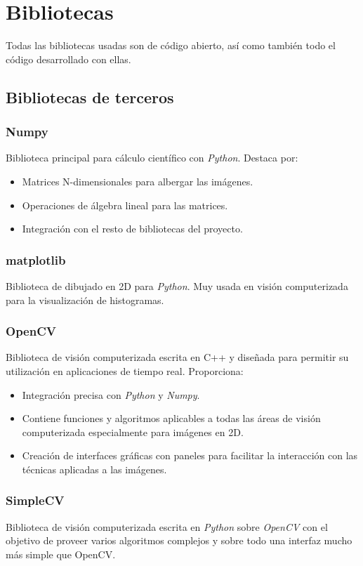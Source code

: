 \chapter{Bibliotecas}
Todas las bibliotecas usadas son de código abierto, así
como también todo el código desarrollado con ellas.

\section{Bibliotecas de terceros}
\subsection{Numpy}
Biblioteca principal para cálculo científico con \emph{Python}. Destaca por:
\begin{itemize}
\item Matrices N-dimensionales para albergar las imágenes.
\item Operaciones de álgebra lineal para las matrices.
\item Integración con el resto de bibliotecas del proyecto.
\end{itemize}

\subsection{matplotlib}
Biblioteca de dibujado en 2D para \emph{Python}. Muy usada en visión
computerizada para la visualización de histogramas.

\subsection{OpenCV}
Biblioteca de visión computerizada escrita en C++ y diseñada para
permitir su utilización en aplicaciones de tiempo real. Proporciona:
\begin{itemize}
\item Integración precisa con \emph{Python} y \emph{Numpy}.
\item Contiene funciones y algoritmos aplicables a todas las áreas de
  visión computerizada especialmente para imágenes en 2D.
\item Creación de interfaces gráficas con paneles para
  facilitar la interacción con las técnicas aplicadas a las imágenes.
\end{itemize}

\subsection{SimpleCV}
Biblioteca de visión computerizada escrita en \emph{Python} sobre
\emph{OpenCV} con el objetivo de proveer varios algoritmos complejos y
sobre todo una interfaz mucho más simple que OpenCV\@.

